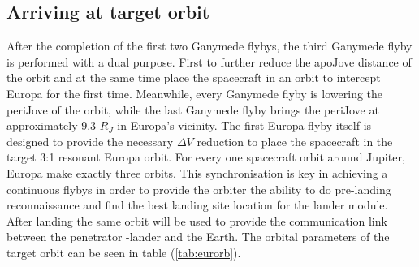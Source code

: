 \subsection{Arriving at target orbit}
After the completion of the first two Ganymede flybys, the third Ganymede flyby is performed with a dual purpose. First to further reduce the apoJove distance of the orbit and at the same time place the spacecraft in an orbit to intercept Europa for the first time. Meanwhile, every Ganymede flyby is lowering the periJove of the orbit, while the last Ganymede flyby brings the periJove at approximately 9.3 $R_J$ in Europa's vicinity. The first Europa flyby itself is designed to provide the necessary $\Delta V$ reduction to place the spacecraft in the target 3:1 resonant Europa orbit. For every one spacecraft orbit around Jupiter, Europa make exactly three orbits. This synchronisation is key in achieving a continuous flybys in order to provide the orbiter the ability to do pre-landing reconnaissance and find the best landing site location for the lander module. After landing the same orbit will be used to provide the communication link between the penetrator -lander and the Earth. The orbital parameters of the target orbit can be seen in table (\ref{tab:eurorb}).

